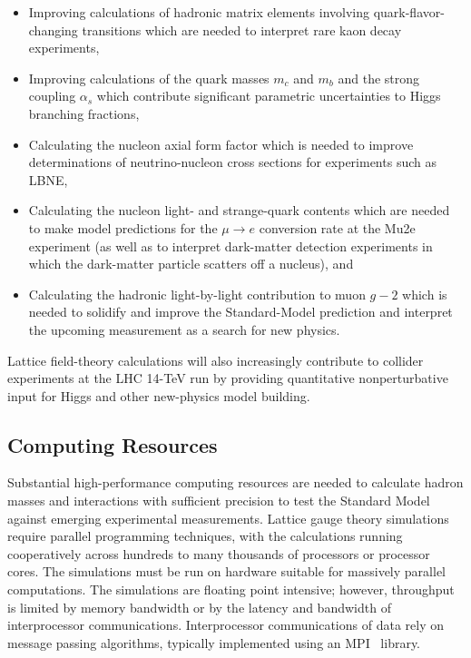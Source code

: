 \begin{itemize}

\item Improving calculations of hadronic matrix elements involving
quark-flavor-changing transitions which are needed to interpret rare kaon
decay experiments,

\item Improving calculations of the quark masses $m_c$ and $m_b$ and the
strong coupling $\alpha_s$ which contribute significant parametric
uncertainties to Higgs branching fractions,

\item Calculating the nucleon axial form factor which is needed to improve
determinations of neutrino-nucleon cross sections for experiments such as
LBNE,

\item Calculating the nucleon light- and strange-quark contents which are
needed to make model predictions for the $\mu \to e$ conversion rate at the
Mu2e experiment (as well as to interpret dark-matter detection experiments in
which the dark-matter particle scatters off a nucleus), and

\item Calculating the hadronic light-by-light contribution to muon $g-2$ which
is needed to solidify and improve the Standard-Model prediction and interpret
the upcoming measurement as a search for new physics.

\end{itemize}

Lattice field-theory calculations will also increasingly contribute to
collider experiments at the LHC 14-TeV run by providing quantitative
nonperturbative input for Higgs and other new-physics model building.

\subsection{Computing Resources}

Substantial high-performance computing resources are needed to calculate
hadron masses and interactions with sufficient precision to test the Standard
Model against emerging experimental measurements.  Lattice gauge theory
simulations require parallel programming techniques, with the calculations
running cooperatively across hundreds to many thousands of processors or
processor cores.  The simulations must be run on hardware suitable for
massively parallel computations. The simulations are floating point intensive;
however, throughput is limited by memory bandwidth or by the latency and
bandwidth of interprocessor communications. Interprocessor communications of
data rely on message passing algorithms, typically implemented using an
MPI~\cite{MPI} library.

